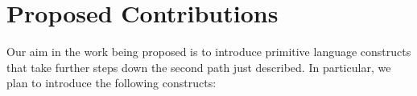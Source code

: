 

\section{Proposed Contributions}
Our aim in the work being proposed is to introduce primitive language constructs that take further steps down the second path just described. In particular, we plan to introduce the following constructs:

